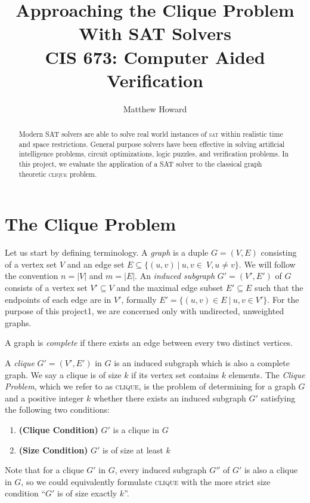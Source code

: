 \documentclass[]{article}
\title{Approaching the Clique Problem\\ With SAT Solvers\\[.2cm]
	\large{CIS 673: Computer Aided Verification}}
\author{Matthew Howard}
\newcommand{\clique}{\textsc{clique}}
\begin{document}
	
	\maketitle
	
	\begin{abstract}
		Modern SAT solvers are able to solve real world instances of \textsc{sat} within realistic time and space restrictions. General purpose solvers have been effective in solving artificial intelligence problems, circuit optimizations, logic puzzles, and verification problems. In this project, we evaluate the application of a SAT solver to the classical graph theoretic \clique{} problem.
	\end{abstract}
	
	\section{The Clique Problem}
	
	Let us start by defining terminology. A \textit{graph} is a duple $G = (V, E)$ consisting of a vertex set $V$ and an edge set $E \subseteq \{(u, v) ~\vert~ u, v \in~V, u \neq v\}$. We will follow the convention $n = |V|$ and $m = |E|$. An \textit{induced subgraph} $G' = (V', E')$ of $G$ consists of a vertex set $V' \subseteq V$ and the maximal edge subset $E' \subseteq E$ such that the endpoints of each edge are in $V'$, formally $E' = \{(u, v) \in E ~\vert~ u, v \in V'\}$. For the purpose of this project1, we are concerned only with undirected, unweighted graphs.
	
	A graph is \textit{complete} if there exists an edge between every two distinct vertices.
	
	A \textit{clique} $G' = (V', E')$ in $G$ is an induced subgraph which is also a complete graph. We say a clique is of size $k$ if its vertex set contains $k$ elements. The \textit{Clique Problem}, which we refer to as \clique{}, is the problem of determining for a graph $G$ and a positive integer $k$ whether there exists an induced subgraph $G'$ satisfying the following two conditions:
	\begin{enumerate}
		\item \textbf{(Clique Condition)} $G'$ is a clique in $G$
		\item \textbf{(Size Condition)} $G'$ is of size at least $k$
	\end{enumerate}	
	
	Note that for a clique $G'$ in $G$, every induced subgraph $G''$ of $G'$ is also a clique in $G$, so we could equivalently formulate \clique{} with the more strict size condition ``$G'$ is of size exactly $k$''.
	
\end{document}
